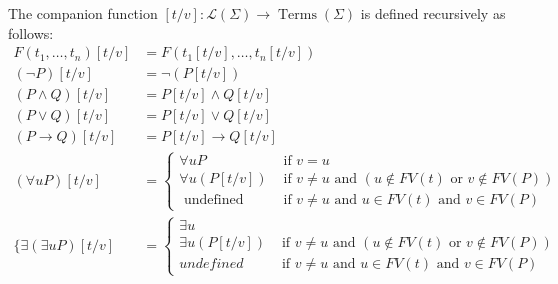 \documentclass[10pt]{article}
\begin{document}
The companion function $[t / v]: \mathcal{L}(\Sigma) \rightarrow \operatorname{Terms}(\Sigma)$ is defined recursively as follows:
$$
\begin{aligned}
F\left(t_{1}, \ldots, t_{n}\right)[t / v] &=F\left(t_{1}[t / v], \ldots, t_{n}[t / v]\right) \\
(\neg P)[t / v] &=\neg(P[t / v]) \\
(P \wedge Q)[t / v] &=P[t / v] \wedge Q[t / v] \\
(P \vee Q)[t / v] &=P[t / v] \vee Q[t / v] \\
(P \rightarrow Q)[t / v] &=P[t / v] \rightarrow Q[t / v] \\
(\forall u P)[t / v] &= \begin{cases}\forall u P & \text { if } v=u \\
\forall u(P[t / v]) & \text { if } v \neq u \text { and }(u \notin F V(t) \text { or } v \notin F V(P)) \\
\text { undefined } & \text { if } v \neq u \text { and } u \in F V(t) \text { and } v \in F V(P)\end{cases} \\
\{\exists(\exists u P)[t / v]&= \begin{cases}\exists u \\
\exists u(P[t / v]) & \text { if } v \neq u \text { and }(u \notin F V(t) \text { or } v \notin F V(P)) \\
u n d e f i n e d & \text { if } v \neq u \text { and } u \in F V(t) \text { and } v \in F V(P)\end{cases}
\end{aligned}
$$
\end{document}
